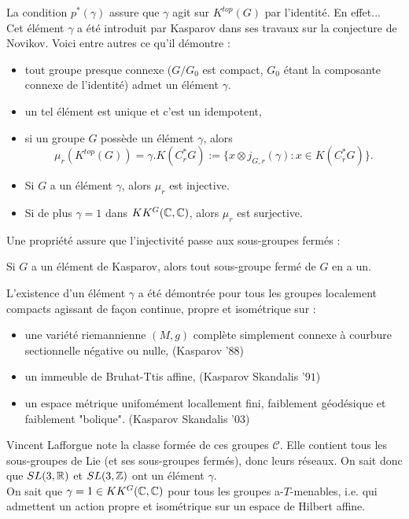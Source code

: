 La condition $p^*(\gamma)$ assure que $\gamma$ agit sur $K^{top}(G)$ par l'identité. En effet...\\

Cet élément $\gamma$ a été introduit par Kasparov dans ses travaux sur la conjecture de Novikov. Voici entre autres ce qu'il démontre :
\begin{itemize}
\item tout groupe presque connexe ($G/G_0$ est compact, $G_0$ étant la composante connexe de l'identité) admet un élément $\gamma$.
\item un tel élément est unique et c'est un idempotent,
\item si un groupe $G$ possède un élément $\gamma$, alors 
\[\mu_r(K^{top}(G)) = \gamma.K(C^*_r G) := \{x\otimes j_{G,r}(\gamma) : x\in K(C^*_r G)\}.\]
\end{itemize}

\begin{Res}[Tu] 
\begin{itemize}
\item Si $G$ a un élément $\gamma$, alors $\mu_r$ est injective.
\item Si de plus $\gamma = 1$ dans $KK^G(\mathbb C,\mathbb C)$, alors $\mu_r$ est surjective.\\
\end{itemize}
\end{Res}

Une propriété assure que l'injectivité passe aux sous-groupes fermés :\\
\begin{prop}
Si $G$ a un élément de Kasparov, alors tout sous-groupe fermé de $G$ en a un.\\
\end{prop}

\begin{Res}
L'existence d'un élément $\gamma$ a été démontrée pour tous les groupes localement compacts agissant de façon continue, propre et isométrique sur :
\begin{itemize}
\item une variété riemannienne $(M,g)$ complète simplement connexe à courbure sectionnelle négative ou nulle, (Kasparov '$88$)
\item un immeuble de Bruhat-Ttis affine, (Kasparov Skandalis '$91$)
\item un espace métrique unifomément locallement fini, faiblement géodésique et faiblement "bolique". (Kasparov Skandalis '$03$)
\end{itemize}
Vincent Lafforgue note la classe formée de ces groupes $\mathcal C$. Elle contient tous les sous-groupes de Lie (et ses sous-groupes fermés), donc leurs réseaux. On sait donc que $SL(3,\mathbb R)$ et $SL(3,\mathbb Z)$ ont un élément $\gamma$.\\

On sait que $\gamma = 1\in KK^G(\mathbb C,\mathbb C)$ pour tous les groupes a-$T$-menables, i.e. qui admettent un action propre et isométrique sur un espace de Hilbert affine. \\
\end{Res}

